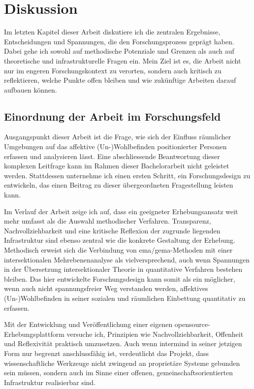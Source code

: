 \chapter{Diskussion} \label{sec:diskussion}

Im letzten Kapitel dieser Arbeit diskutiere ich die zentralen Ergebnisse, Entscheidungen und Spannungen, die den Forschungsprozess geprägt haben. Dabei gehe ich sowohl auf methodische Potenziale und Grenzen als auch auf theoretische und infrastrukturelle Fragen ein. Mein Ziel ist es, die Arbeit nicht nur im engeren Forschungskontext zu verorten, sondern auch kritisch zu reflektieren, welche Punkte offen bleiben und wie zukünftige Arbeiten darauf aufbauen können.

\section{Einordnung der Arbeit im Forschungsfeld}

Ausgangspunkt dieser Arbeit ist die Frage, wie sich der Einfluss räumlicher Umgebungen auf das affektive (Un-)Wohlbefinden  positionierter Personen erfassen und analysieren lässt. Eine abschliessende Beantwortung dieser komplexen Leitfrage kann im Rahmen dieser Bachelorarbeit nicht geleistet werden. Stattdessen unternehme ich einen ersten Schritt, ein Forschungsdesign zu entwickeln, das einen Beitrag zu dieser übergeordneten Fragestellung leisten kann.

Im Verlauf der Arbeit zeige ich auf, dass ein geeigneter Erhebungsansatz weit mehr umfasst als die Auswahl methodischer Verfahren. Transparenz, Nachvollziehbarkeit und eine kritische Reflexion der zugrunde liegenden Infrastruktur sind ebenso zentral wie die konkrete Gestaltung der Erhebung. Methodisch erweist sich die Verbindung von \gls{ema}/\gls{gema}-Methoden mit einer intersektionalen Mehrebenenanalyse als vielversprechend, auch wenn Spannungen in der Übersetzung intersektionaler Theorie in quantitative Verfahren bestehen bleiben. Das hier entwickelte Forschungsdesign kann somit als ein möglicher, wenn auch nicht spannungsfreier Weg verstanden werden, affektives (Un-)Wohlbefinden in seiner sozialen und räumlichen Einbettung quantitativ zu erfassen.

Mit der Entwicklung und Veröffentlichung einer eigenen \gls{opensource}-Erhebungsplattform versuche ich, Prinzipien wie Nachvollziehbarkeit, Offenheit und Reflexivität praktisch umzusetzen. Auch wenn \gls{intermind} in seiner jetzigen Form nur begrenzt anschlussfähig ist, verdeutlicht das Projekt, dass wissenschaftliche Werkzeuge nicht zwingend an proprietäre Systeme gebunden sein müssen, sondern auch im Sinne einer offenen, gemeinschaftsorientierten Infrastruktur realisierbar sind.


